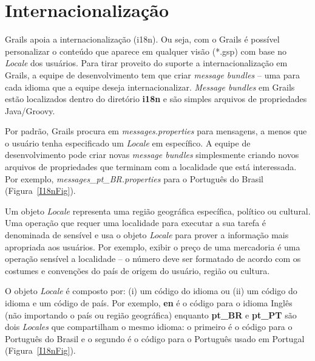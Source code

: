 \section{Internacionalização}\label{I18n}

Grails  apoia a internacionalização  (i18n). Ou  seja, com  o Grails  é possível
personalizar o conteúdo  que aparece em qualquer visão (*.gsp)  com base no {\it
  Locale} dos usuários. Para tirar  proveito do suporte a internacionalização em
Grails, a equipe  de desenvolvimento tem que criar {\it  message bundles} -- uma
para cada idioma  que a equipe deseja internacionalizar.   {\it Message bundles}
em  Grails  estão localizados  dentro  do diretório  {\bf  i18n}  e são  simples
arquivos de propriedades    Java/Groovy.     

\vspace{0.2cm}

Por padrão, Grails procura em  {\it messages.properties} para mensagens, a menos
que o  usuário tenha  especificado um  {\it Locale} em  específico. A  equipe de
desenvolvimento  pode criar  novas  {\it message  bundles} simplesmente  criando
novos  arquivos  de  propriedades  que   terminam  com  a  localidade  que  está
interessada.  Por exemplo, {\it messages\_pt\_BR.properties} para o Português do
Brasil (Figura~\ref{I18nFig}).

\begin{small}
\begin{cBox}
Um objeto {\it Locale} representa  uma região geográfica específica, político ou
cultural. Uma  operação que requer uma  localidade para executar a  sua tarefa é
denominada de sensível e usa o objeto {\it Locale} para prover a informação mais
apropriada aos  usuários. Por exemplo,  exibir o preço  de uma mercadoria  é uma
operação sensível a  localidade -- o número deve ser formatado  de acordo com os
costumes e convenções do país de origem do usuário, região ou cultura.

O objeto {\it Locale} é composto por:  (i) um código do idioma ou (ii) um código
do idioma e  um código de país. Por  exemplo, {\bf en} é o código  para o idioma
Inglês (não importando o país ou região geográfica) enquanto {\bf pt\_BR} e {\bf
  pt\_PT} são dois {\it Locales} que compartilham o mesmo idioma: o primeiro é o
código para o Português do Brasil e  o segundo é o código para o Português usado
em Portugal (Figura~\ref{I18nFig}).
\end{cBox}
\end{small}

